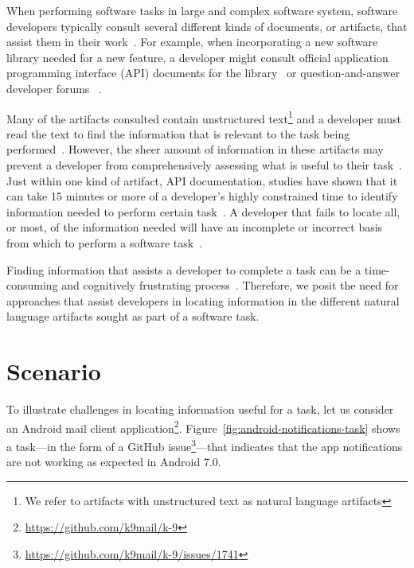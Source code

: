 

When performing software tasks in large and complex software system, software developers typically consult several different kinds of documents, or artifacts, that assist them in their work~\cite{Starke2009, Meyer2017}. For example, 
when incorporating a new software library needed for a new feature, a developer might consult official application programming interface (API) documents for the library~\cite{robillard2011field, umarji2008archetypal} or 
 question-and-answer developer forums 
 ~\cite{parnin2012, silva2019}.



Many of the artifacts consulted
contain unstructured text\footnote{We refer to artifacts with unstructured text as natural language artifacts} and 
a developer must read the text to find the information that is relevant to the task being performed~\cite{Bavota2016}.
However, 
the sheer amount of information in these artifacts may prevent a developer from comprehensively assessing what is useful to their task~\cite{Murphy2005}.
Just within one kind of artifact, API
documentation, studies have shown that it can take 15 minutes or more
of a developer's highly constrained time to identify 
information needed to perform certain task~\cite{endrikat2014, Meyer2017}. 
A developer that fails to locate all, or most, of the information needed
will have an incomplete or incorrect basis from which to perform a software task~\cite{Murphy2005}.



Finding information that assists a developer to complete a task can be a time-consuming
 and cognitively frustrating process~\cite{Begel2008,
 robillard2011field}. Therefore, we posit the need for approaches that assist developers in locating information in the different natural language artifacts sought  as part of a software task.

 
 






 \section{Scenario}
 \label{cp1:example}
 
 
 
 To illustrate challenges in locating information useful for a task, let us consider an  Android mail client application\footnote{\url{https://github.com/k9mail/k-9}}.
 Figure~\ref{fig:android-notifications-task} shows a task---in the form of a GitHub issue\footnote{\url{https://github.com/k9mail/k-9/issues/1741}}---that indicates that the app notifications 
 are not working as expected in Android 7.0. 
 
